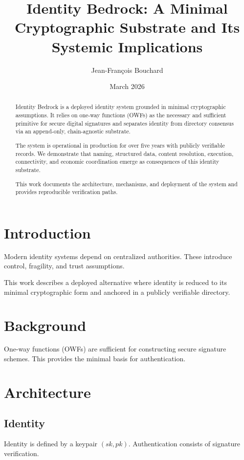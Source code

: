 \documentclass[11pt,a4paper]{article}
\title{\textbf{Identity Bedrock: A Minimal Cryptographic Substrate and Its Systemic Implications}}
\author{Jean-François Bouchard}
\date{March 2026}
\begin{document}
\maketitle

\begin{abstract}
Identity Bedrock is a deployed identity system grounded in minimal cryptographic assumptions. It relies on one-way functions (OWFs) as the necessary and sufficient primitive for secure digital signatures and separates identity from directory consensus via an append-only, chain-agnostic substrate.

The system is operational in production for over five years with publicly verifiable records. We demonstrate that naming, structured data, content resolution, execution, connectivity, and economic coordination emerge as consequences of this identity substrate.

This work documents the architecture, mechanisms, and deployment of the system and provides reproducible verification paths.
\end{abstract}

\section{Introduction}

Modern identity systems depend on centralized authorities. These introduce control, fragility, and trust assumptions.

This work describes a deployed alternative where identity is reduced to its minimal cryptographic form and anchored in a publicly verifiable directory.

\section{Background}

One-way functions (OWFs) are sufficient for constructing secure signature schemes. This provides the minimal basis for authentication.

\section{Architecture}

\subsection{Identity}

Identity is defined by a keypair $(sk, pk)$. Authentication consists of signature verification.
\end{document}
